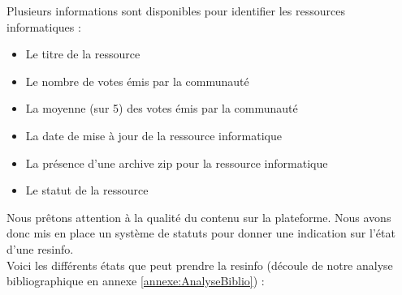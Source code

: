 Plusieurs informations sont disponibles pour identifier les ressources informatiques :

\begin{itemize}
    \item Le titre de la ressource
    \item Le nombre de votes émis par la communauté
    \item La moyenne (sur 5) des votes émis par la communauté
    \item La date de mise à jour de la ressource informatique
    \item La présence d'une archive zip pour la ressource informatique
    \item Le statut de la ressource
\end{itemize}



Nous prêtons attention à la qualité du contenu sur la plateforme. Nous avons donc mis en place un système de statuts pour donner une indication sur l'état d'une \gls{resinfo}.\\

Voici les différents états que peut prendre la \gls{resinfo} (découle de notre analyse bibliographique en annexe \ref{annexe:AnalyseBiblio}) :

